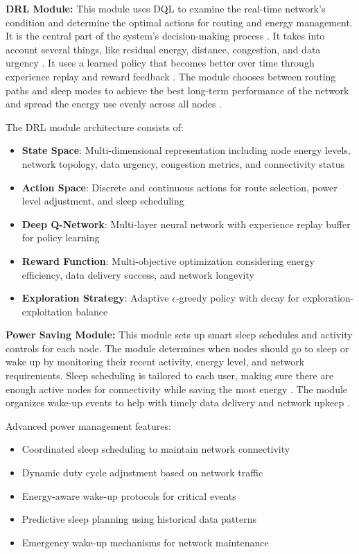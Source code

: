 \textbf{DRL Module:} This module uses DQL \cite{vijayanpv2020deep, 8243989} to examine the real-time network's condition and determine the optimal actions for routing and energy management. It is the central part of the system's decision-making process \cite{9014179, MAZYAVKINA2021105400}. It takes into account several things, like residual energy, distance, congestion, and data urgency \cite{doi:10.1177/1550147719833541}. It uses a learned policy that becomes better over time through experience replay and reward feedback \cite{8701570}. The module chooses between routing paths and sleep modes to achieve the best long-term performance of the network and spread the energy use evenly across all nodes \cite{9231883}.

The DRL module architecture consists of:
\begin{itemize}
    \item \textbf{State Space}: Multi-dimensional representation including node energy levels, network topology, data urgency, congestion metrics, and connectivity status
    \item \textbf{Action Space}: Discrete and continuous actions for route selection, power level adjustment, and sleep scheduling
    \item \textbf{Deep Q-Network}: Multi-layer neural network with experience replay buffer for policy learning
    \item \textbf{Reward Function}: Multi-objective optimization considering energy efficiency, data delivery success, and network longevity
    \item \textbf{Exploration Strategy}: Adaptive $\epsilon$-greedy policy with decay for exploration-exploitation balance
\end{itemize}

\textbf{Power Saving Module:}  
This module sets up smart sleep schedules and activity controls for each node. The module determines when nodes should go to sleep or wake up by monitoring their recent activity, energy level, and network requirements. Sleep scheduling \cite{abadi2022rlbeep, SACHITHANANDAM2025101071} is tailored to each user, making sure there are enough active nodes for connectivity while saving the most energy \cite{s24061993}. The module organizes wake-up events to help with timely data delivery and network upkeep \cite{9292984}.

Advanced power management features:
\begin{itemize}
    \item Coordinated sleep scheduling to maintain network connectivity
    \item Dynamic duty cycle adjustment based on network traffic
    \item Energy-aware wake-up protocols for critical events
    \item Predictive sleep planning using historical data patterns
    \item Emergency wake-up mechanisms for network maintenance
\end{itemize}

